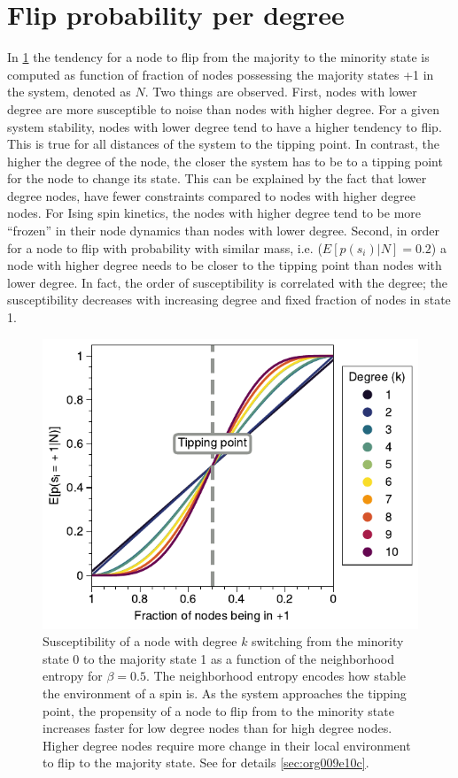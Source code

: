 \documentclass[a4paper, 11pt, twocolumn]{article}
\begin{document}
\section{Flip probability per degree}
\label{sec:deg_flip}
In \cref{fig:maj_flip}  the tendency for a  node to flip
from  the majority  to  the minority  state  is computed  as
function of fraction of nodes possessing the majority states
+1 in the  system, denoted as $N$. Two  things are observed.
First, nodes with lower degree are more susceptible to noise
than nodes with higher degree.  For a given system stability,
nodes with lower degree tend  to have a higher tendency
to flip. This is true for all distances of the system to the
tipping point.  In contrast,  the higher  the degree  of the
node, the closer the system has to be to a tipping point for
the node to  change its state. This can be  explained by the
fact that lower degree nodes, have fewer constraints compared
to nodes with higher degree  nodes. For Ising spin kinetics,
the nodes  with higher  degree tend to  be more  ``frozen'' in
their node dynamics than nodes with lower degree. Second, in
order for a node to flip with probability with similar mass,
i.e. ($E[p(s_i) |  N] = 0.2$) a node with  higher degree needs
to  be closer  to the  tipping point  than nodes  with lower
degree. In  fact, the order of  susceptibility is correlated
with   the  degree;   the   susceptibility  decreases   with
increasing degree and fixed fraction of nodes in state 1.

\begin{figure}[htbp]
\centering
\includegraphics[width=.9\linewidth]{./figures/fig_majority_flip.pdf}
\caption{\label{fig:maj_flip}Susceptibility of a node with degree $k$ switching from the minority state 0 to the majority state 1 as a function of the neighborhood entropy for $\beta = 0.5$. The neighborhood entropy encodes how stable the environment of a spin is. As the system approaches the tipping point, the propensity of a node to flip from to the minority state increases faster for low degree nodes than for high degree nodes. Higher degree nodes require more change in their local environment to flip to the majority state. See for details \ref{sec:org009e10c}.}
\end{figure}
\end{document}
